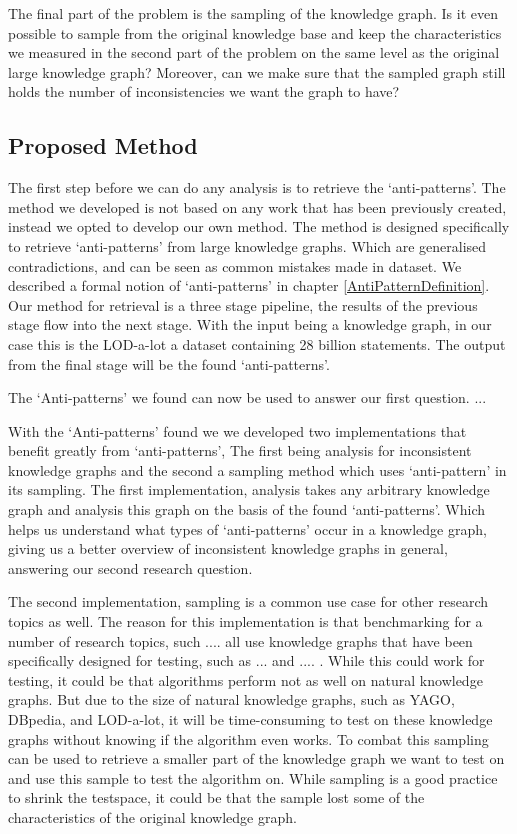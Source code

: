 \documentclass{article}
\begin{document}
The final part of the problem is the sampling of the knowledge graph. Is it even possible to sample from the original knowledge base and keep the characteristics we measured in the second part of the problem on the same level as the original large knowledge graph? Moreover, can we make sure that the sampled graph still holds the number of inconsistencies we want the graph to have? 

\subsection{Proposed Method}
The first step before we can do any analysis is to retrieve the `anti-patterns'. The method we developed is not based on any work that has been previously created, instead we opted to develop our own method. The method is designed specifically to retrieve `anti-patterns' from large knowledge graphs. Which are generalised contradictions, and can be seen as common mistakes made in dataset. We described a formal notion of `anti-patterns' in chapter \ref{AntiPatternDefinition}. Our method for retrieval is a three stage pipeline, the results of the previous stage flow into the next stage. With the input being a knowledge graph, in our case this is the LOD-a-lot\cite{JavierD:2017} a dataset containing 28 billion statements. The output from the final stage will be the found `anti-patterns'. 

The `Anti-patterns' we found can now be used to answer our first question. ... 

With the `Anti-patterns' found we we developed two implementations that benefit greatly from `anti-patterns', The first being analysis for inconsistent knowledge graphs and the second a sampling method which uses `anti-pattern' in its sampling. The first implementation, analysis takes any arbitrary knowledge graph and analysis this graph on the basis of the found `anti-patterns'. Which helps us understand what types of `anti-patterns' occur in a knowledge graph, giving us a better overview of inconsistent knowledge graphs in general, answering our second research question.

The second implementation, sampling is a common use case for other research topics as well. The reason for this implementation is that benchmarking for a number of research topics, such .... all use knowledge graphs that have been specifically designed for testing, such as ... and  .... . While this could work for testing, it could be that algorithms perform not as well on natural knowledge graphs. But due to the size of natural knowledge graphs, such as YAGO, DBpedia, and LOD-a-lot, it will be time-consuming to test on these knowledge graphs without knowing if the algorithm even works. To combat this sampling can be used to retrieve a smaller part of the knowledge graph we want to test on and use this sample to test the algorithm on. While sampling is a good practice to shrink the testspace, it could be that the sample lost some of the characteristics of the original knowledge graph. 
\end{document}
